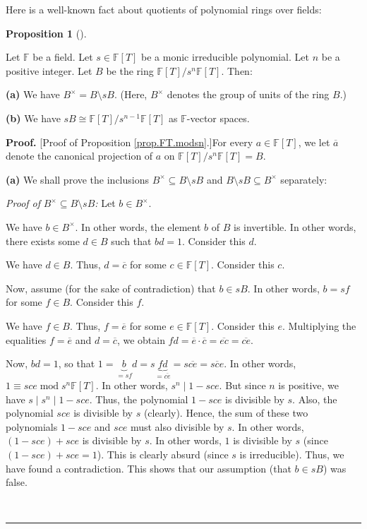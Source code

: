 \documentclass[numbers=enddot,12pt,final,onecolumn,notitlepage]{scrartcl}%
\theoremstyle{definition}
\newtheorem{prop}[theo]{Proposition}
\newenvironment{proposition}[1][]
{\begin{prop}[#1]\begin{leftbar}}
{\end{leftbar}\end{prop}}
\newenvironment{proof}[1][Proof]{\noindent\textbf{#1.} }{\ \rule{0.5em}{0.5em}}
\begin{document}
Here is a well-known fact about quotients of polynomial rings over fields:

\begin{proposition}
\label{prop.FT.modsn}Let $\mathbb{F}$ be a field. Let $s\in\mathbb{F}\left[
T\right]  $ be a monic irreducible polynomial. Let $n$ be a positive integer.
Let $B$ be the ring $\mathbb{F}\left[  T\right]  /s^{n}\mathbb{F}\left[
T\right]  $. Then:

\textbf{(a)} We have $B^{\times}=B\setminus sB$. (Here, $B^{\times}$ denotes
the group of units of the ring $B$.)

\textbf{(b)} We have $sB\cong\mathbb{F}\left[  T\right]  /s^{n-1}%
\mathbb{F}\left[  T\right]  $ as $\mathbb{F}$-vector spaces.
\end{proposition}

\begin{proof}
[Proof of Proposition \ref{prop.FT.modsn}.]For every $a\in\mathbb{F}\left[
T\right]  $, we let $\overline{a}$ denote the canonical projection of $a$ on
$\mathbb{F}\left[  T\right]  /s^{n}\mathbb{F}\left[  T\right]  =B$.

\textbf{(a)} We shall prove the inclusions $B^{\times}\subseteq B\setminus sB$
and $B\setminus sB\subseteq B^{\times}$ separately:

\textit{Proof of }$B^{\times}\subseteq B\setminus sB$\textit{:} Let $b\in
B^{\times}$.

We have $b\in B^{\times}$. In other words, the element $b$ of $B$ is
invertible. In other words, there exists some $d\in B$ such that $bd=1$.
Consider this $d$.

We have $d\in B$. Thus, $d=\overline{c}$ for some $c\in\mathbb{F}\left[
T\right]  $. Consider this $c$.

Now, assume (for the sake of contradiction) that $b\in sB$. In other words,
$b=sf$ for some $f\in B$. Consider this $f$.

We have $f\in B$. Thus, $f=\overline{e}$ for some $e\in\mathbb{F}\left[
T\right]  $. Consider this $e$. Multiplying the equalities $f=\overline{e}$
and $d=\overline{c}$, we obtain $fd=\overline{e}\cdot\overline{c}%
=\overline{ec}=\overline{ce}$.

Now, $bd=1$, so that $1=\underbrace{b}_{=sf}d=s\underbrace{fd}_{=\overline
{ce}}=s\overline{ce}=\overline{sce}$. In other words, $1\equiv
sce\operatorname{mod}s^{n}\mathbb{F}\left[  T\right]  $. In other words,
$s^{n}\mid1-sce$. But since $n$ is positive, we have $s\mid s^{n}\mid1-sce$.
Thus, the polynomial $1-sce$ is divisible by $s$. Also, the polynomial $sce$
is divisible by $s$ (clearly). Hence, the sum of these two polynomials $1-sce$
and $sce$ must also divisible by $s$. In other words, $\left(  1-sce\right)
+sce$ is divisible by $s$. In other words, $1$ is divisible by $s$ (since
$\left(  1-sce\right)  +sce=1$). This is clearly absurd (since $s$ is
irreducible). Thus, we have found a contradiction. This shows that our
assumption (that $b\in sB$) was false.


\end{proof}
\end{document}

